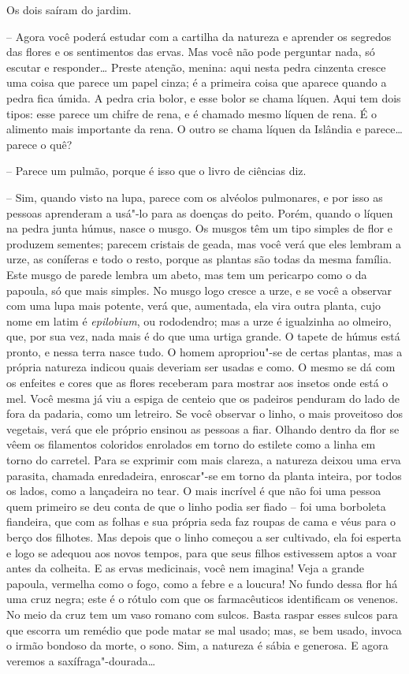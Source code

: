 Os dois saíram do jardim.

-- Agora você poderá estudar com a cartilha da natureza e aprender os
segredos das flores e os sentimentos das ervas. Mas você não pode
perguntar nada, só escutar e responder\ldots{} Preste atenção, menina: aqui
nesta pedra cinzenta cresce uma coisa que parece um papel cinza; é a
primeira coisa que aparece quando a pedra fica úmida. A pedra cria
bolor, e esse bolor se chama líquen. Aqui tem dois tipos: esse parece
um chifre de rena, e é chamado mesmo líquen de rena. É o alimento
mais importante da rena.  O outro se chama líquen da Islândia e
parece\ldots{} parece o quê?

-- Parece um pulmão, porque é isso que o livro de ciências diz.

-- Sim, quando visto na lupa, parece com os alvéolos pulmonares, e por
isso as pessoas aprenderam a usá"-lo para as doenças do peito. Porém,
quando o líquen na pedra junta húmus, nasce o musgo. Os musgos têm um
tipo simples de flor e produzem sementes; parecem cristais de geada,
mas você verá que eles lembram a urze, as coníferas e todo o resto,
porque as plantas são todas da mesma família. Este musgo de parede
lembra um abeto, mas tem um pericarpo como o da papoula, só que mais
simples. No musgo logo cresce a urze, e se você a observar com uma lupa
mais potente, verá que, aumentada, ela vira outra planta, cujo nome
em latim é \textit{epilobium}, ou rododendro; mas a urze é
igualzinha ao olmeiro, que, por sua vez, nada mais é do que uma urtiga
grande.  O tapete de húmus está pronto, e nessa terra nasce tudo. O
homem apropriou"-se de certas plantas, mas a própria natureza indicou
quais deveriam ser usadas e como. O mesmo se dá com os enfeites e cores
que as flores receberam para mostrar aos insetos onde está o mel. Você
mesma já viu a espiga de centeio que os padeiros penduram do lado de
fora da padaria, como um letreiro. Se você observar o linho, o mais
proveitoso dos vegetais, verá que ele próprio ensinou as pessoas a
fiar. Olhando dentro da flor se vêem os filamentos coloridos enrolados
em torno do estilete como a linha em torno do carretel. Para se
exprimir com mais clareza, a natureza deixou uma erva parasita, chamada
enredadeira, enroscar"-se em torno da planta inteira, por todos
os lados, como a lançadeira no tear. O mais incrível é que não foi uma
pessoa quem primeiro se deu conta de que o linho podia ser fiado -- foi
uma borboleta fiandeira, que com as folhas e sua própria seda faz
roupas de cama e véus para o berço dos filhotes. Mas depois que o linho
começou a ser cultivado, ela foi esperta e logo se adequou aos novos
tempos, para que seus filhos estivessem aptos a voar antes da colheita.
E as ervas medicinais, você nem imagina! Veja a grande papoula,
vermelha como o fogo, como a febre e a loucura! No fundo dessa flor há
uma cruz negra; este é o rótulo com que os farmacêuticos identificam os
venenos. No meio da cruz tem um vaso romano com sulcos. Basta raspar
esses sulcos para que escorra um remédio que pode matar se mal usado;
mas, se bem usado, invoca o irmão bondoso da morte, o sono. Sim, a
natureza é sábia e generosa. E agora veremos a saxífraga"-dourada\ldots{}


